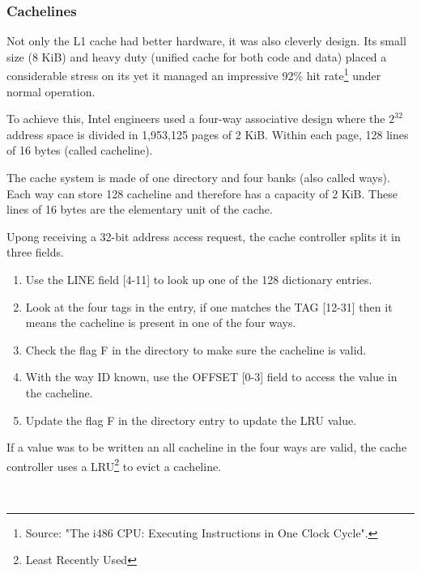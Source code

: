 \subsubsection{Cachelines}
Not only the L1 cache had better hardware, it was also cleverly design. Its small size (8 KiB) and heavy duty (unified cache for both code and data) placed a considerable stress on its yet it managed an impressive 92\% hit rate\footnote{Source: "The i486 CPU: Executing Instructions in One Clock Cycle".} under normal operation.\\
\par
To achieve this, Intel engineers used a four-way associative design where the $2^{32}$ address space is divided in 1,953,125 pages of 2 KiB. Within each page, 128 lines of 16 bytes (called cacheline).\\
\par
{}
\par
The cache system is made of one directory and four banks (also called ways). Each way can store 128 cacheline and therefore has a capacity of 2 KiB. These lines of 16 bytes are the elementary unit of the cache.\\
\par
Upong receiving a 32-bit address access request, the cache controller splits it in three fields.
\begin{enumerate}
\item Use the LINE field [4-11] to look up one of the 128 dictionary entries.
\item Look at the four tags in the entry, if one matches the TAG [12-31] then it means the cacheline is present in one of the four ways.
\item Check the flag F in the directory to make sure the cacheline is valid.
\item With the way ID known, use the OFFSET [0-3] field to access the value in the cacheline.
\item Update the flag F in the directory entry to update the LRU value.
\end{enumerate}
\par
If a value was to be written an all cacheline in the four ways are valid, the cache controller uses a LRU\footnote{Least Recently Used} to evict a cacheline.\\
\par
{}
\par
{}\\
\par



